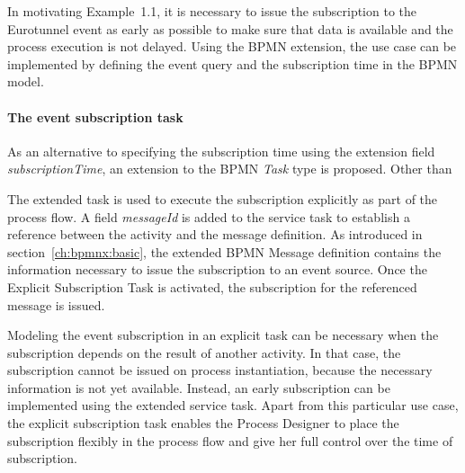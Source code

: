 In motivating Example~1.1, it is necessary to issue the subscription to the Eurotunnel event as early as possible to make sure that data is available and the process execution is not delayed.
Using the BPMN extension, the use case can be implemented by defining the event query and the subscription time in the BPMN model. 

\paragraph{The event subscription task\newline}
As an alternative to specifying the subscription time using the extension field \textit{subscriptionTime}, an extension to the BPMN \textit{Task} type is proposed. 
Other than \cite{mandal:2017} 




The extended task is used to execute the subscription explicitly as part of the process flow.
A field \textit{messageId} is added to the service task to establish a reference between the activity and the message definition.
As introduced in section~\autoref{ch:bpmnx:basic}, the extended BPMN Message definition contains the information necessary to issue the subscription to an event source.
Once the Explicit Subscription Task is activated, the subscription for the referenced message is issued. 

Modeling the event subscription in an explicit task can be necessary when the subscription depends on the result of another activity. In that case, the subscription cannot be issued on process instantiation, because the necessary information is not yet available. Instead, an early subscription can be implemented using the extended service task.
Apart from this particular use case, the explicit subscription task enables the Process Designer to place the subscription flexibly in the process flow and give her full control over the time of subscription.


